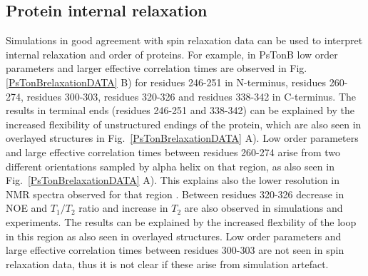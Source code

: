 \documentclass[pre,aps,floatfix,authordate1-4,twocolumn]{revtex4-1}
\begin{document}



\subsection{Protein internal relaxation}

Simulations in good agreement with spin relaxation data can be used
to interpret internal relaxation and order of proteins. For example,
in PsTonB low order parameters and larger effective correlation times
are observed in Fig. \ref{PsTonBrelaxationDATA} B) for residues 246-251
in N-terminus, residues 260-274, residues 300-303, residues 320-326
and residues 338-342 in C-terminus. The results in terminal ends
(residues 246-251 and 338-342)
can be explained by the increased flexibility of unstructured endings
of the protein, which are also seen in overlayed structures in
Fig.~\ref{PsTonBrelaxationDATA} A). Low order parameters and
large effective correlation times between residues 260-274 arise
from two different orientations sampled by alpha helix on that region, as also
seen in Fig.~\ref{PsTonBrelaxationDATA} A). This explains also the
lower resolution in NMR spectra observed for that region \cite{??}.
Between residues 320-326 decrease in NOE and $T_1/T_2$ ratio and increase
in $T_2$ are also observed in simulations and experiments. The results
can be explained by the increased flexbility of the loop in this region
as also seen in overlayed structures. Low order parameters and large
effective correlation times between residues 300-303 are not seen
in spin relaxation data, thus it is not clear if these arise from
simulation artefact.
\end{document}
